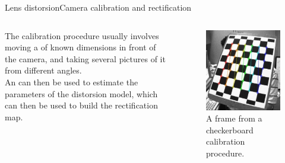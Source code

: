 \begin{frame}{Lens distorsion}{Camera calibration and rectification}
	\begin{columns}
		The calibration procedure usually involves moving a  of known dimensions in front of the camera, and taking several pictures of it from different angles.\\
		\bigskip
		An  can then be used to estimate the parameters of the distorsion model, which can then be used to build the rectification map.

		\begin{figure}
			\centering
			\includegraphics[width=.6\textwidth]{calibration}
			\caption{A frame from a checkerboard calibration procedure.}
			\label{fig:calibration}
		\end{figure}
	\end{columns}
\end{frame}
